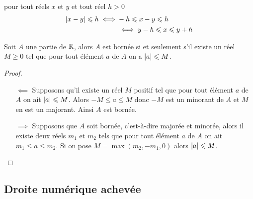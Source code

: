 \begin{prop}
  pour tout réels \(x\) et \(y\) et tout réel \(h>0\)
  \begin{align}
    \left\lvert x-y\right\rvert\leqslant h \iff & -h \leqslant x-y \leqslant h\\
    &\iff y-h \leqslant x \leqslant y+h
  \end{align}
\end{prop}
\begin{prop}
  Soit \(A\) une partie de \(\mathbb{R}\), alors \(A\) est bornée si et seulement s'il existe un réel \(M\geqslant 0\) tel que pour tout élément \(a\) de \(A\) on a \(\left\lvert a\right\rvert\leqslant M\).
\end{prop}
\begin{proof}
  \begin{itemize}
  \item[\(\impliedby\)] Supposons qu'il existe un réel \(M\) positif tel que pour tout élément \(a\) de \(A\) on ait \(\left\lvert a\right\rvert\leqslant M\). Alors \(-M\leqslant a\leqslant M\) donc \(-M\) est un minorant de \(A\) et \(M\) en est un majorant. Ainsi \(A\) est bornée.
  \item[\(\implies\)] Supposons que \(A\) soit bornée, c'est-à-dire majorée et minorée, alors il existe deux réels \(m_1\) et \(m_2\) tels que pour tout élément \(a\) de \(A\) on ait \(m_1\leqslant a\leqslant m_2\). Si on pose \(M=\max(m_2,-m_1,0)\) alors \(\left\lvert a\right\rvert\leqslant M\).
  \end{itemize}
\end{proof}

\subsection{Droite numérique achevée}

